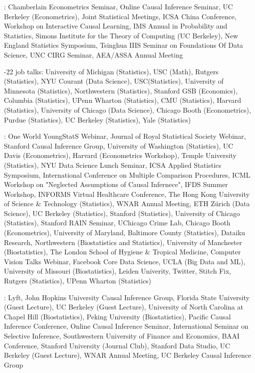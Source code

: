 \documentclass{article}
\begin{document}
\vspace{4mm}
: Chamberlain Econometrics Seminar, Online Causal Inference Seminar, UC Berkeley (Econometrics), Joint Statistical Meetings, ICSA China Conference, Workshop on Interactive Causal Learning, IMS Annual in Probability and Statistics, Simons Institute for the Theory of Computing (UC Berkeley), New England Statistics Symposium, Tsinghua IIIS Seminar on Foundations Of Data Science, UNC CIRG Seminar, AEA/ASSA Annual Meeting

\vspace{4mm}
-22 job talks: University of Michigan (Statistics), USC (Math), Rutgers (Statistics), NYU Courant (Data Science), USC(Statistics), University of Minnesota (Statistics), Northwestern (Statistics), Stanford GSB (Economics), Columbia (Statistics), UPenn Wharton (Statistics), CMU (Statistics), Harvard (Statistics), University of Chicago (Data Science), Chicago Booth (Econometrics), Purdue (Statistics), UC Berkeley (Statistics), Yale (Statistics)

\vspace{4mm}
: One World YoungStatS Webinar, Journal of Royal Statistical Society Webinar, Stanford Causal Inference Group, University of Washington (Statistics), UC Davis (Econometrics), Harvard (Econometrics Workshop), Temple University (Statistics), NYU Data Science Lunch Seminar, ICSA Applied Statistics Symposium, International Conference on Multiple Comparison Procedures, ICML Workshop on "Neglected Assumptions of Causal Infernece", IFDS Summer Workshop, INFORMS Virtual Healthcare Conference, The Hong Kong University of Science \& Technology (Statistics), WNAR Annual Meeting, ETH Z\"{u}rich (Data Science), UC Berkeley (Statistics), Stanford (Statistics), University of Chicago (Statistics), Stanford RAIN Seminar, UChicago Crime Lab, Chicago Booth (Econometrics), University of Maryland, Baltimore County (Statistics), Dataiku Research, Northwestern (Biostatistics and Statistics), University of Manchester (Biostatistics), The London School of Hygiene \& Tropical Medicine, Computer Vision Talks Webinar, Facebook Core Data Science, UCLA (Big Data and ML), University of Missouri (Biostatistics), Leiden Univerity, Twitter, Stitch Fix, Rutgers (Statistics), UPenn Wharton (Statistics)

\vspace{4mm}
:
Lyft, John Hopkins University Causal Inference Group, Florida State University (Guest Lecture), UC Berkeley (Guest Lecture), University of North Carolina at Chapel Hill (Biostatistics), Peking University (Biostatistics), Pacific Causal Inference Conference, Online Causal Inference Seminar, International Seminar on Selective Inference, Southwestern University of Finance and Economics, BAAI Conference, Stanford University (Journal Club), Stanford Data Studio, UC Berkeley (Guest Lecture), WNAR Annual Meeting, UC Berkeley Causal Inference Group
\end{document}
